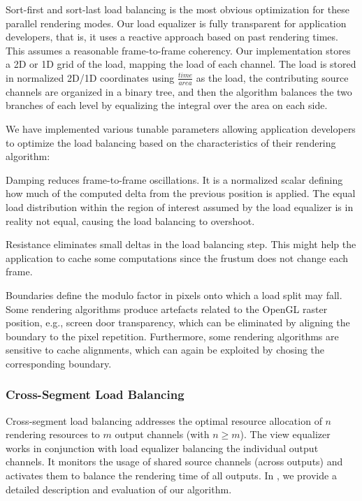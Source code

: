 \documentclass[10pt,journal,compsoc]{IEEEtran}
\begin{document}
Sort-first and sort-last load balancing is the most obvious optimization for
these parallel rendering modes. Our load equalizer is fully transparent for
application developers, that is, it uses a reactive approach based on past
rendering times. This assumes a reasonable frame-to-frame coherency. Our
implementation stores a 2D or 1D grid of the load, mapping the load of each
channel. The load is stored in normalized 2D/1D coordinates using
$\frac{time}{area}$ as the load, the contributing source channels are organized
in a binary tree, and then the algorithm balances the two branches of each level
by equalizing the integral over the area on each side.

We have implemented various tunable parameters allowing application developers
to optimize the load balancing based on the characteristics of their rendering
algorithm:
\begin{compactdesc}
\item[Damping] reduces frame-to-frame oscillations. It is a normalized scalar
  defining how much of the computed delta from the previous position is
  applied. The equal load distribution within the region of interest assumed by
  the load equalizer is in reality not equal, causing the load balancing to
  overshoot.
\item[Resistance] eliminates small deltas in the load balancing step. This might
  help the application to cache some computations since the frustum does not
  change each frame.
\item[Boundaries] define the modulo factor in pixels onto which a load split may
  fall. Some rendering algorithms produce artefacts related to the OpenGL raster
  position, e.g., screen door transparency, which can be eliminated by aligning
  the boundary to the pixel repetition. Furthermore, some rendering algorithms
  are sensitive to cache alignments, which can again be exploited by chosing the
  corresponding boundary.
\end{compactdesc}

\subsubsection{Cross-Segment Load Balancing}

Cross-segment load balancing addresses the optimal resource allocation of $n$
rendering resources to $m$ output channels (with $n\geq m$). The view equalizer
works in conjunction with load equalizer balancing the individual output
channels. It monitors the usage of shared source channels (across outputs) and
activates them to balance the rendering time of all outputs. In \cite{EEP:11},
we provide a detailed description and evaluation of our algorithm.
\end{document}

